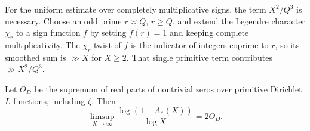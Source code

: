 For the uniform estimate over completely multiplicative signs, the term \(X^2/Q^3\) is necessary. Choose an odd prime \(r\asymp Q\), \(r\ge Q\), and extend the Legendre character \(\chi_r\) to a sign function \(f\) by setting \(f(r)=1\) and keeping complete multiplicativity. The \(\chi_r\) twist of \(f\) is the indicator of integers coprime to \(r\), so its smoothed sum is \(\gg X\) for \(X\ge2\). That single primitive term contributes \(\gg X^2/Q^3\).

\begin{theorem}\label{thm:conductor-exponent}
Let \(\Theta_D\) be the supremum of real parts of nontrivial zeros over primitive Dirichlet \(L\)-functions, including \(\zeta\). Then
\[
 \limsup_{X\to\infty}\frac{\log(1+A_*(X))}{\log X}
 =2\Theta_D .
\]
\end{theorem}
